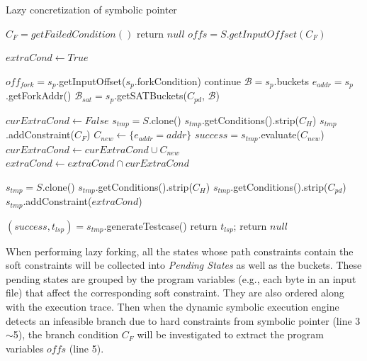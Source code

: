 \begin{algorithm}
 \LinesNumbered
  \caption{Lazy concretization of symbolic pointer}
  \label{LCSP}
  $C_F = getFailedCondition()$\;
  {
  	return $null$\;
  }
  $offs = S.getInputOffset(C_F)$\;
  
  $extraCond\leftarrow True$\;
  {
  	$off_{fork} = s_p$.getInputOffset($s_p$.forkCondition)\;
  	{continue\;}
  	$\mathcal{B}=s_p$.buckets\;
  	$e_{addr} = s_p$.getForkAddr()\;
  	$\mathcal{B}_{sat}=s_p$.getSATBuckets($C_{pd}$, $\mathcal{B}$)\;
  	
  	$curExtraCond\leftarrow False$\;
  	{
      $s_{tmp} = S$.clone()\;
      $s_{tmp}$.getConditions().strip($C_H$)\;
      $s_{tmp}$.addConstraint($C_F$)\;
      $C_{new}\leftarrow \{e_{addr}=addr\}$\;
      $success = s_{tmp}$.evaluate($C_{new}$)\;
      {$curExtraCond\leftarrow curExtraCond\cup C_{new}$\;}
  	}
  	$extraCond\leftarrow extraCond\cap curExtraCond$\;
  }
  
  $s_{tmp} = S$.clone()\;
  $s_{tmp}$.getConditions().strip($C_H$)\;
  $s_{tmp}$.getConditions().strip($C_{pd}$)\;
  $s_{tmp}$.addConstraint($extraCond$)\;
  
  $(success, t_{lsp}) = s_{tmp}$.generateTestcase()\;
  {
    return $t_{lsp}$;
  }
  return $null$\;
\end{algorithm}

When performing lazy forking, all the states whose path constraints 
contain the soft constraints will be collected into \emph{Pending States}
as well as the buckets. 
These pending states are grouped by the program variables (e.g., each 
byte in an input file) that affect the corresponding soft constraint. 
They are also ordered along with the execution trace.
Then when the dynamic symbolic execution engine detects an infeasible 
branch due to hard constraints from symbolic pointer (line 3$\sim$5), 
the branch condition $C_F$ will be 
investigated to extract the program variables $offs$ (line 5).



